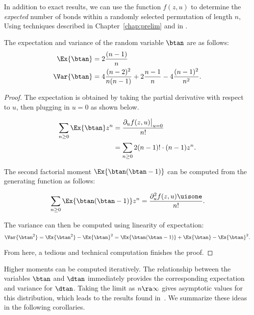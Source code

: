 \documentclass[12pt,twoside]{memoir}
\begin{document}
    In addition to exact results, we can use the function $f(z,u)$ to determine
    the \emph{expected}  number of bonds within a randomly
    selected permutation of length $n$, Using techniques described in
    Chapter~\ref{chap:prelim} and in \cite{flajolet}. 
    
    
    \begin{theorem} \label{fixpat:thm:exvar}
      The expectation and variance of the random variable $\btan$ are as
      follows:
      $$ \begin{aligned}
          \Ex{\btan} &= 2\frac{(n-1)}{n} \\
          \Var{\btan} &= 4\frac{(n-2)^2}{n(n-1)} + 2\frac{n-1}{n} -
          4\frac{(n-1)^2}{n^2} . 
          \end{aligned} $$
    \end{theorem}
    \begin{proof}
      The expectation is obtained by taking the partial derivative with respect
      to $u$, then plugging in $u = 0$ as shown below. 

      $$ \begin{aligned}
        \sum_{n\geq 0}\Ex{\btan}z^n 
          &= \frac{\partial_u f(z,u) \big|_{u=0}}{n!} \\
          &= \sum_{n \geq 0} 2 (n-1)! \cdot (n-1) z^n. 
        \end{aligned}$$
      
      The second factorial moment $\Ex{\btan(\btan - 1)}$ can be computed from
      the generating function as follows:
      
      $$ \sum_{n \geq 0} \Ex{\btan(\btan - 1)}z^n 
        = \frac{\partial_u^2 f(z,u) \uisone}{n!}.$$
      
      The variance can then be computed using linearity of expectation:
      $$ \Var{\btan^2} = \Ex{\btan^2} - \Ex{\btan}^2 
        = \Ex{\btan(\btan - 1)} + \Ex{\btan} - \Ex{\btan}^2.$$
      
      From here, a tedious and technical computation finishes the proof. 
    \end{proof}

    Higher moments can be computed iteratively. 
    The relationship between the variables $\btan$ and $\dtan$ immediately
    provides the corresponding expectation and variance for $\dtan$. Taking the
    limit as $n \ra \infty$ gives asymptotic values for this distribution,
    which leads to the results found in~\cite{Kaplansky, Wolfowitz}. We
    summarize these ideas in the following corollaries. 
\end{document}

